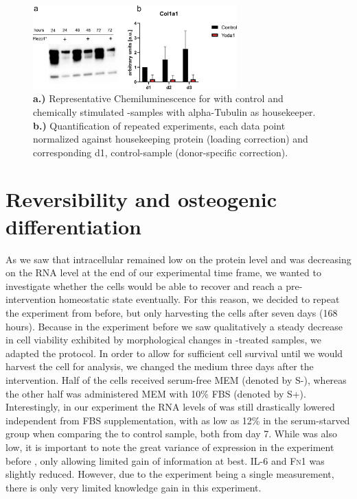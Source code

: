 \begin{figure}[htbp]
\centering
\includegraphics[width = 0.7\textwidth]{NormalYodaExp_WesternBlot_Col1a1.png}
\caption{
	\textbf{a.)} Representative Chemiluminescence for \colone with control and chemically stimulated \Piezo{}-samples with alpha-Tubulin as housekeeper.
	\textbf{b.)} Quantification of repeated experiments, each data point normalized against housekeeping protein (loading correction) and corresponding d1, control-sample (donor-specific correction).}
\label{fig:Yoda_Norm_WB}
\end{figure}

\section{Reversibility and osteogenic differentiation}
As we saw that intracellular \colone{} remained low on the protein level and was decreasing on the RNA level at the end of our experimental time frame, we wanted to investigate whether the cells would be able to recover and reach a pre-intervention homeostatic state eventually. For this reason, we decided to repeat the experiment from before, but only harvesting the cells after seven days (168 hours). Because in the experiment before we saw qualitatively a steady decrease in cell viability exhibited by morphological changes in \Yoda{}-treated samples, we adapted the protocol. In order to allow for sufficient cell survival  until we would harvest the cell for analysis, we changed the medium three days after the intervention. Half of the cells received serum-free MEM\textalpha{} (denoted by S-), whereas the other half was administered MEM\textalpha{} with 10\% FBS (denoted by S+).\\
Interestingly, in our experiment the RNA levels of \colone{} was still drastically lowered independent from FBS supplementation, with as low as 12\% in the serum-starved group  when comparing the \Yoda{} to control sample, both from day 7. While \colthree{} was also low, it is important to note the great variance of \colthree{} expression in the experiment before , only allowing limited gain of information at best. IL-6 and \textsc{Fn}1 was slightly reduced. However, due to the experiment being a single measurement, there is only very limited knowledge gain in this experiment. 

